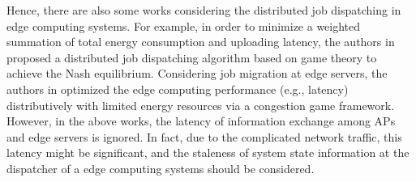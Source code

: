 Hence, there are also some works considering the distributed job dispatching in edge computing systems. For example, in order to minimize a weighted
summation of total energy consumption and uploading latency, the authors in \cite{ToN-Xuchen2016} proposed a distributed job dispatching algorithm based on game theory to achieve the Nash equilibrium. 
Considering job migration at edge servers, the authors in \cite{ToN-xujie2018} optimized the edge computing performance (e.g., latency) distributively with limited energy resources via a congestion game framework.
However, in the above works, the latency of information exchange among APs and edge servers is ignored.
In fact, due to the complicated network traffic, this latency might be significant, and the staleness of system state information at the dispatcher of a edge computing systems should be considered.


